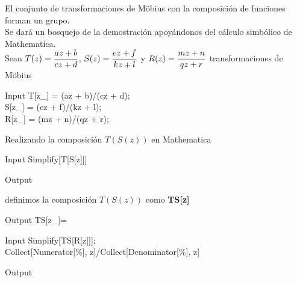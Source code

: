 \begin{prop}
	El conjunto de transformaciones de M\"obius con la composición de funciones forman un grupo.\\
	Se dará un bosquejo de la demostración apoyándonos del cálculo simbólico de Mathematica. \\
	Sean $T(z)=\dfrac{az+b}{cz+d}$, $S(z)=\dfrac{ez+f}{kz+l}$ y $R(z)=\dfrac{mz+n}{qz+r}$  transformaciones de M\"obius
	
	\begin{mmaCell}{Input}
		T[z_] = (az + b)/(cz + d);\\S[z_] = (ez + f)/(kz + l);\\R[z_] = (mz + n)/(qz + r);
	\end{mmaCell}
	Realizando la composición $T(S(z))$ en Mathematica 
	\begin{mmaCell}{Input}
		Simplify[T[S[z]]]
	\end{mmaCell}
	\begin{mmaCell}[moredefined={f, d}]{Output}
	\end{mmaCell}


definimos la composición $T(S(z))$ como \textbf{TS[z]}
\begin{mmaCell}[moredefined={f, d}]{Output}
	   TS[z_]=
\end{mmaCell}
\begin{mmaCell}{Input}
	  Simplify[TS[R[z]]];\\Collect[Numerator[\%], z]/Collect[Denominator[\%], z]
\end{mmaCell}

\begin{mmaCell}[moredefined={f}]{Output}
\end{mmaCell}




\end{prop}
